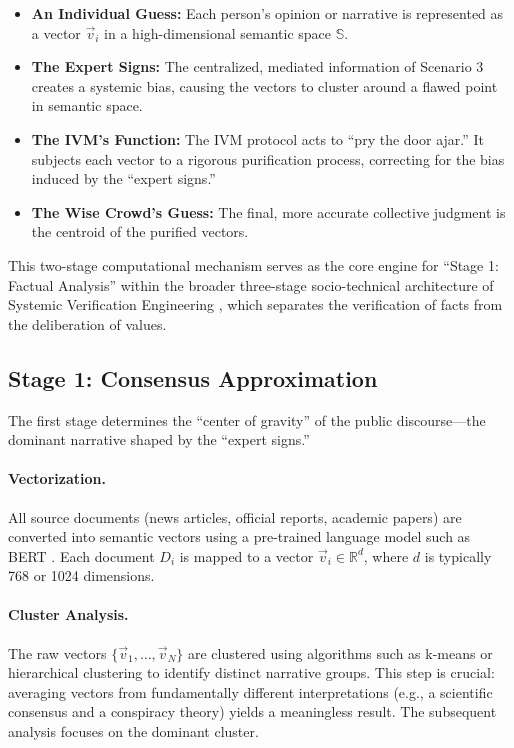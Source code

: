 \documentclass[11pt,a4paper]{article}
\begin{document}
\begin{itemize}
    \item \textbf{An Individual Guess:} Each person's opinion or narrative is represented as a vector $\vec{v}_{i}$ in a high-dimensional semantic space $\mathbb{S}$.
    \item \textbf{The Expert Signs:} The centralized, mediated information of Scenario 3 creates a systemic bias, causing the vectors to cluster around a flawed point in semantic space.
    \item \textbf{The IVM's Function:} The IVM protocol acts to ``pry the door ajar.'' It subjects each vector to a rigorous purification process, correcting for the bias induced by the ``expert signs.''
    \item \textbf{The Wise Crowd's Guess:} The final, more accurate collective judgment is the centroid of the purified vectors.
\end{itemize}

This two-stage computational mechanism serves as the core engine for ``Stage 1: Factual Analysis'' within the broader three-stage socio-technical architecture of Systemic Verification Engineering \citep{Kovnatsky2025SVE2}, which separates the verification of facts from the deliberation of values.

\subsection{Stage 1: Consensus Approximation}

The first stage determines the ``center of gravity'' of the public discourse---the dominant narrative shaped by the ``expert signs.''

\paragraph{Vectorization.} All source documents (news articles, official reports, academic papers) are converted into semantic vectors using a pre-trained language model such as BERT \citep{Devlin2018}. Each document $D_i$ is mapped to a vector $\vec{v}_i \in \mathbb{R}^d$, where $d$ is typically 768 or 1024 dimensions.

\paragraph{Cluster Analysis.} The raw vectors $\{\vec{v}_1, \ldots, \vec{v}_N\}$ are clustered using algorithms such as k-means or hierarchical clustering to identify distinct narrative groups. This step is crucial: averaging vectors from fundamentally different interpretations (e.g., a scientific consensus and a conspiracy theory) yields a meaningless result. The subsequent analysis focuses on the dominant cluster.
\end{document}
